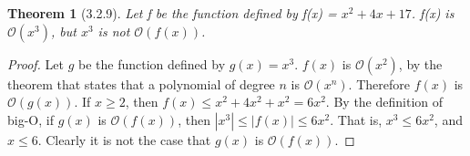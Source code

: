 \documentclass[a4paper, 12pt]{article}
\theoremstyle{plain}
\newtheorem*{theorem*}{Theorem}
\begin{document}
	
	\begin{theorem*}[3.2.9]
		Let f be the function defined by f(x) = $x^{2} + 4x + 17$. \newline f(x) is $\mathcal{O}(x^{3})$, but $x^{3}$ is not $\mathcal{O}(f(x))$.
	\end{theorem*}
	
	\begin{proof}
		Let $g$ be the function defined by $g(x) = x^{3}$. $f(x)$ is $\mathcal{O}(x^{2})$, by the theorem that states that a polynomial of degree $n$ is $\mathcal{O}(x^{n})$. Therefore $f(x)$ is $\mathcal{O}(g(x))$. \newline \indent If $x \ge 2$, then $f(x) \le x^{2} + 4x^{2} + x^{2} = 6x^{2}$. By the definition of big-O, if $g(x)$ is $\mathcal{O}(f(x))$, then $|x^{3}| \le |f(x)| \le 6x^{2}$. That is, $x^{3} \le 6x^{2}$, and $x \le 6$. Clearly it is not the case that $g(x)$ is $\mathcal{O}(f(x))$.
	\end{proof}
\end{document}
